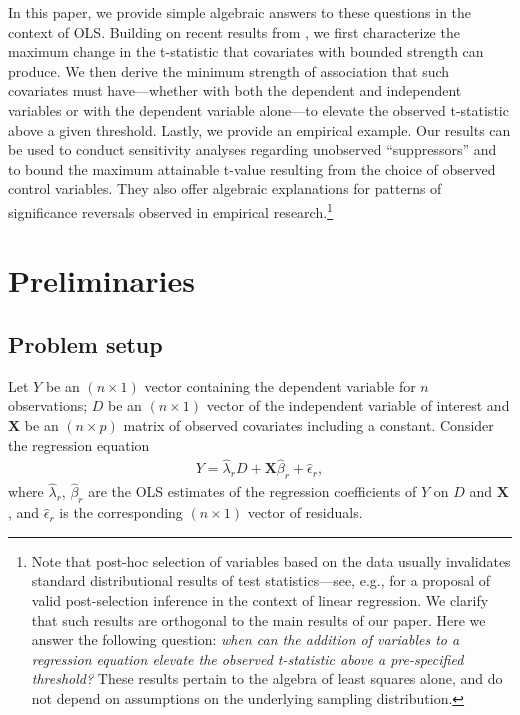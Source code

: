 \documentclass[sts]{imsart}
\theoremstyle{plain}
\theoremstyle{definition}
\begin{document}
In this paper, we provide simple algebraic answers to these questions in the context of OLS. Building on recent results from \cite{cinelli_making_2020, cinelli2025omitted}, we first characterize the maximum change in the t-statistic that covariates with bounded strength can produce. We then derive the minimum strength of association that such covariates must have---whether with both the dependent and independent variables or with the dependent variable alone---to elevate the observed t-statistic above a given threshold. Lastly, we provide an empirical example. Our results can be used to conduct sensitivity analyses regarding unobserved ``suppressors'' and to bound the maximum attainable t-value resulting from the choice of observed control variables. They also offer algebraic explanations for patterns of significance reversals observed in empirical research.\footnote{Note that post-hoc selection of variables based on the data usually invalidates standard distributional results of test statistics---see, e.g., \cite{berk2013valid} for a proposal of valid post-selection inference in the context of linear regression. We clarify that such results are orthogonal to the main results of our paper. Here we answer the following question: \emph{when can the addition of variables to a regression equation elevate the observed t-statistic above a pre-specified threshold?} These results pertain to the algebra of least squares alone, and do not depend on assumptions on the underlying sampling distribution.}

\section{Preliminaries} \label{background}

\subsection{Problem setup}
Let $Y$ be an $(n \times 1)$ vector containing the dependent variable  for $n$ observations; $D$ be an $(n \times 1)$ vector of the independent variable of interest and $\mathbf{X}$ be an $(n \times p)$ matrix of observed covariates including a constant. Consider the regression equation
\begin{align}
    Y = \hat{\lambda}_{r }D + \mathbf{X}\hat{\beta}_r + \hat{\epsilon}_{r}, \label{resmodel}
\end{align}
where $\hat{\lambda}_{r}$, $\hat{\beta}_r$ are the OLS estimates of the regression coefficients of $Y$  on $D$ and $\mathbf{X}$, and $\hat{\epsilon}_{r}$ is the corresponding $(n \times 1)$ vector of residuals. 
\end{document}
